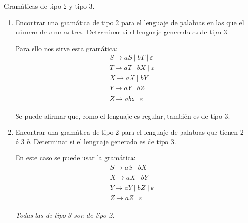 \documentclass[12pt]{book} %
\begin{document}
\begin{ejercicio}
Gramáticas de tipo 2 y tipo 3. 

\begin{enumerate}[label=\alph*)]
    \item Encontrar una gramática de tipo 2 para el lenguaje de palabras en las que el número de $b$ no es tres.  
        Determinar si el lenguaje generado es de tipo 3.

        \begin{solucion}[a]

        Para ello nos sirve esta gramática:
        \begin{align*}
        S \rightarrow aS \mid bT \mid \varepsilon \\
        T \rightarrow aT \mid bX \mid \varepsilon \\
        X \rightarrow aX \mid bY \\
        Y \rightarrow aY \mid bZ \\
        Z \rightarrow abz \mid \varepsilon 
        \end{align*}

        Se puede afirmar que, como el lenguaje es regular, también es de tipo 3.

        \end{solucion}

    \item Encontrar una gramática de tipo 2 para el lenguaje de palabras que tienen 2 ó 3 $b$.  
        Determinar si el lenguaje generado es de tipo 3.

        \begin{solucion}[b]

        En este caso se puede usar la gramática:
        \begin{align*}
        S \rightarrow aS \mid bX \\
        X \rightarrow aX \mid bY \\
        Y \rightarrow aY \mid bZ \mid \varepsilon \\
        Z \rightarrow aZ \mid \varepsilon 
        \end{align*}

        \textit{Todas las de tipo 3 son de tipo 2.}

        \end{solucion}


\end{enumerate}

\end{ejercicio}
\end{document}
